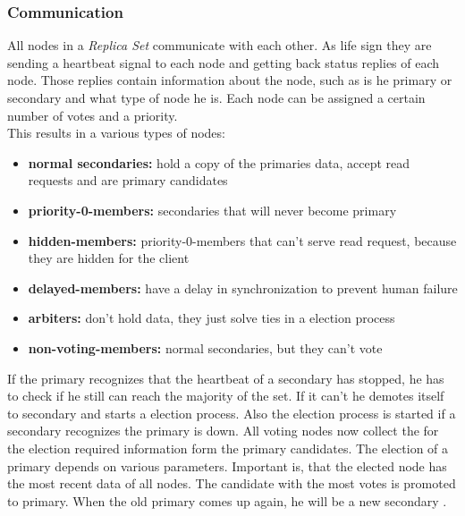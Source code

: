 \subsubsection{Communication}
All nodes in a \textit{Replica Set} communicate with each other. As life sign they are sending a heartbeat signal to each node and getting back status replies of each node. Those replies contain information about the node, such as is he primary or secondary and what type of node he is. Each node can be assigned a certain number of votes and a priority.\\
This results in a various types of nodes:
\begin{itemize}
  \item \textbf{normal secondaries:} hold a copy of the primaries data, accept read requests and are primary candidates
  \item \textbf{priority-0-members:} secondaries that will never become primary
  \item \textbf{hidden-members:} priority-0-members that can't serve read request, because they are hidden for the client
  \item \textbf{delayed-members:} have a delay in synchronization to prevent human failure
  \item \textbf{arbiters:} don't hold data, they just solve ties in a election process
  \item \textbf{non-voting-members:} normal secondaries, but they can't vote
\end{itemize}
If the primary recognizes that the heartbeat of a secondary has stopped, he has to check if he still can reach the majority of the set. If it can't he demotes itself to secondary and starts a election process. Also the election process is started if a secondary recognizes the primary is down. All voting nodes now collect the for the election required information form the primary candidates. The election of a primary depends on various parameters. Important is, that the elected node has the most recent data of all nodes. The candidate with the most votes is promoted to primary. When the old primary comes up again, he will be a new secondary \cite{Edward2015,Hows2013}.

